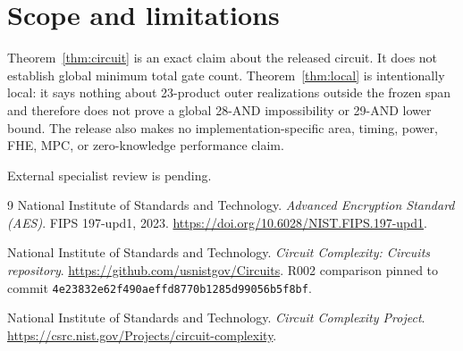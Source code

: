 \documentclass[11pt]{article}
\begin{document}
\section{Scope and limitations}
Theorem~\ref{thm:circuit} is an exact claim about the released circuit.  It does not establish global minimum total gate count.  Theorem~\ref{thm:local} is intentionally local: it says nothing about 23-product outer realizations outside the frozen span and therefore does not prove a global 28-AND impossibility or 29-AND lower bound.  The release also makes no implementation-specific area, timing, power, FHE, MPC, or zero-knowledge performance claim.

External specialist review is pending.

\begin{thebibliography}{9}
National Institute of Standards and Technology.
\emph{Advanced Encryption Standard (AES)}. FIPS 197-upd1, 2023.
\url{https://doi.org/10.6028/NIST.FIPS.197-upd1}.

National Institute of Standards and Technology.
\emph{Circuit Complexity: Circuits repository}.
\url{https://github.com/usnistgov/Circuits}.
R002 comparison pinned to commit \texttt{4e23832e62f490aeffd8770b1285d99056b5f8bf}.

National Institute of Standards and Technology.
\emph{Circuit Complexity Project}.
\url{https://csrc.nist.gov/Projects/circuit-complexity}.
\end{thebibliography}
\end{document}
